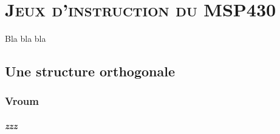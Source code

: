 
\chapter{\textsc{Jeux d'instruction du MSP430}}

Bla bla bla


\section{Une structure orthogonale}


\subsection{Vroum}


\paragraph{zzz}

